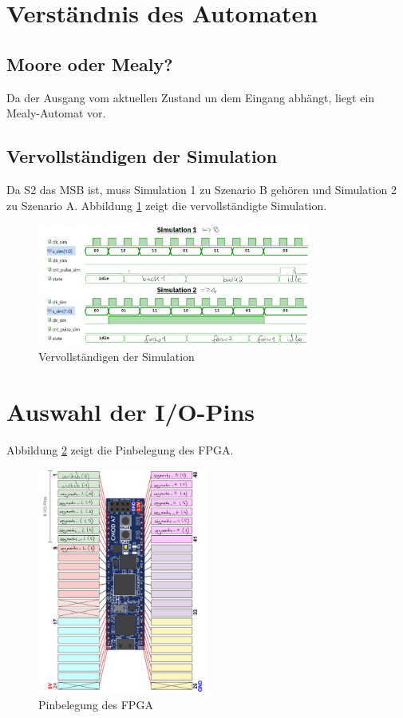 \documentclass[
    paper=a4,
    parskip=half,
]{scrartcl}
\begin{document}
\section{Verständnis des Automaten}

    \subsection{Moore oder Mealy?}
        Da der Ausgang vom aktuellen Zustand un dem Eingang abhängt, liegt ein Mealy-Automat vor. 

    \subsection{Vervollständigen der Simulation}
        Da S2 das MSB ist, muss Simulation 1 zu Szenario B gehören und Simulation 2 zu Szenario A. Abbildung \ref{fig:2} zeigt die vervollständigte Simulation.

        \begin{figure}[hb]
            \centering
            \includegraphics[width=0.8\textwidth]{simulation.png}  
            \caption{Vervollständigen der Simulation}
            \label{fig:2}
        \end{figure}

\section{Auswahl der I/O-Pins}
    Abbildung \ref{fig:3} zeigt die Pinbelegung des FPGA.

    \begin{figure}[hb]
        \centering
        \includegraphics[width=0.5\textwidth]{pinbelegung.png}  
        \caption{Pinbelegung des FPGA}
        \label{fig:3}
    \end{figure}
\end{document}
